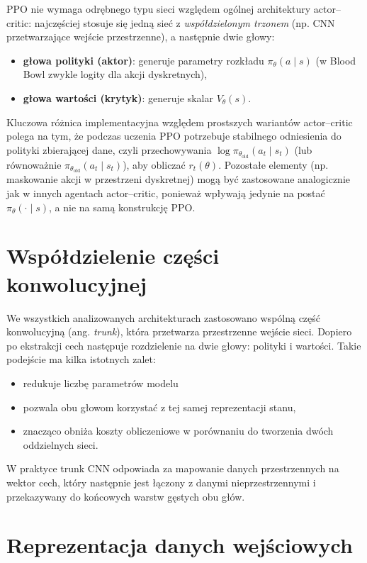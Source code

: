 PPO nie wymaga odrębnego typu sieci względem ogólnej architektury actor--critic: najczęściej stosuje się
jedną sieć z \emph{współdzielonym trzonem} (np. CNN przetwarzające wejście przestrzenne),
a następnie dwie głowy:
\begin{itemize}
	\item \textbf{głowa polityki (aktor)}: generuje parametry rozkładu $\pi_\theta(a\mid s)$ (w Blood Bowl zwykle logity dla akcji dyskretnych),
	\item \textbf{głowa wartości (krytyk)}: generuje skalar $V_\theta(s)$.
\end{itemize}
Kluczowa różnica implementacyjna względem prostszych wariantów actor--critic polega na tym,
że podczas uczenia PPO potrzebuje stabilnego odniesienia do polityki zbierającej dane,
czyli przechowywania $\log \pi_{\theta_{\text{old}}}(a_t\mid s_t)$ (lub równoważnie $\pi_{\theta_{\text{old}}}(a_t\mid s_t)$),
aby obliczać $r_t(\theta)$. Pozostałe elementy (np. maskowanie akcji w przestrzeni dyskretnej) mogą być
zastosowane analogicznie jak w innych agentach actor--critic, ponieważ wpływają jedynie na postać
$\pi_\theta(\cdot\mid s)$, a nie na samą konstrukcję PPO.




\section{Współdzielenie części konwolucyjnej}

We wszystkich analizowanych architekturach zastosowano wspólną część konwolucyjną (ang. \textit{trunk}), która przetwarza przestrzenne wejście sieci. Dopiero po ekstrakcji cech następuje rozdzielenie na dwie głowy: polityki i wartości. Takie podejście ma kilka istotnych zalet:
\begin{itemize}
	\item redukuje liczbę parametrów modelu
	\item pozwala obu głowom korzystać z tej samej reprezentacji stanu,
	\item znacząco obniża koszty obliczeniowe w porównaniu do tworzenia dwóch oddzielnych sieci.
\end{itemize}

W praktyce trunk CNN odpowiada za mapowanie danych przestrzennych na wektor cech, który następnie jest łączony z danymi nieprzestrzennymi i przekazywany do końcowych warstw gęstych obu głów.

\section{Reprezentacja danych wejściowych}

